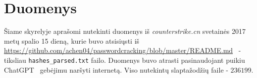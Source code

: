 \section{Duomenys}
\label{sec:Duomenys}

Šiame skyrelyje aprašomi nutekinti duomenys iš \textit{counterstrike.cn} svetainės 2017 metų spalio 15 dieną, kurie buvo atsisiųsti iš \url{https://github.com/achen04/passwordcracking/blob/master/README.md}~\cite{GitHub} - tiksliau \texttt{hashes\_parsed.txt} failo.
Duomenys buvo atrasti pasinaudojant puikiu ChatGPT~\cite{chatgpt_bendrai} gebėjimu naršyti internetą.
Viso nutekintų slaptažodžių faile - $236199$.